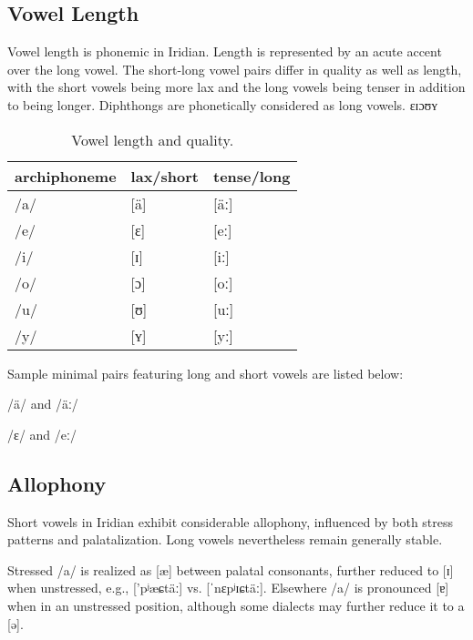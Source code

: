 \subsection{Vowel Length}

Vowel length is phonemic in Iridian. Length is represented by an acute accent over the long vowel. The short-long vowel pairs differ in quality as well as length, with the short vowels being more lax and the long vowels being tenser in addition to being longer. Diphthongs are phonetically considered as long vowels.
ɛɪɔʊʏ
\begin{table}[h!]
	\small
	\caption{Vowel length and quality.}
	\medskip
	\begin{tabu} to 0.7\textwidth{MMM}
		\toprule
		{\sc archiphoneme} & {\sc lax/short} &{\sc tense/long}\\ \midrule

		/a/	& [\"a]	& [\"aː]		\\
		/e/	& [ɛ]	& [eː]		\\
		/i/	& [ɪ]	& [iː]		\\
		/o/	& [ɔ]	& [oː]		\\
		/u/	& [ʊ] & [uː]		\\
		/y/	& [ʏ]	& [yː]		\\
		\bottomrule
	\end{tabu}
\end{table}

Sample minimal pairs featuring long and short vowels are listed below:

\pex
\a /\"a/ and /\"aː/\\

\a /ɛ/ and /eː/	
\xe

\subsection{Allophony}

Short vowels in Iridian exhibit considerable allophony, influenced by both stress patterns and palatalization. Long vowels nevertheless remain generally stable.

Stressed /a/ is realized as [\ae] between palatal consonants, further reduced to [ɪ] when unstressed, e.g.,  ['pʲæɕtäː] vs.  [ˈnɛpʲɪɕtäː]. Elsewhere /a/ is pronounced [ɐ] when in an unstressed position, although some dialects may further reduce it to a [ə].

